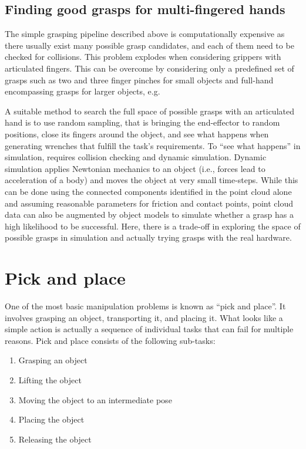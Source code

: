 \subsection{Finding good grasps for multi-fingered hands}

The simple grasping pipeline described above is computationally expensive as there usually exist many possible grasp candidates, and each of them need to be checked for collisions. This problem explodes when considering grippers with articulated fingers. This can be overcome by considering only a predefined set of grasps such as two and three finger pinches for small objects and full-hand encompassing grasps for larger objects, e.g.

A suitable method to search the full space of possible grasps with an articulated hand is to use random sampling, that is bringing the end-effector to random positions, close its fingers around the object, and see what happens when generating wrenches that fulfill the task's requirements.
To ``see what happens'' in simulation, requires collision checking and dynamic simulation. Dynamic simulation applies Newtonian mechanics to an object (i.e., forces lead to acceleration of a body) and moves the object at very small time-steps. While this can be done using the connected components identified in the point cloud alone and assuming reasonable parameters for friction and contact points, point cloud data can also be augmented by object models to simulate whether a grasp has a high likelihood to be successful. Here, there is a trade-off in exploring the space of possible grasps in simulation and actually trying grasps with the real hardware.


\section{Pick and place}
One of the most basic manipulation problems is known as ``pick and place''. It involves grasping an object, transporting it, and placing it. What looks like a simple action is actually a sequence of individual tasks that can fail for multiple reasons. Pick and place consists of the following sub-tasks:

\begin{enumerate}
\item Grasping an object
\item Lifting the object
\item Moving the object to an intermediate pose
\item Placing the object
\item Releasing the object
\end{enumerate}

